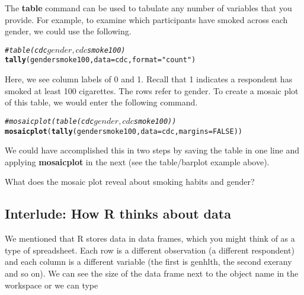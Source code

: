 \documentclass{article}\usepackage[]{graphicx}\usepackage[]{color}
\makeatletter
\newcommand{\hlnum}[1]{\textcolor[rgb]{0.686,0.059,0.569}{#1}}%
\newcommand{\hlstr}[1]{\textcolor[rgb]{0.192,0.494,0.8}{#1}}%
\newcommand{\hlcom}[1]{\textcolor[rgb]{0.678,0.584,0.686}{\textit{#1}}}%
\newcommand{\hlopt}[1]{\textcolor[rgb]{0,0,0}{#1}}%
\newcommand{\hlstd}[1]{\textcolor[rgb]{0.345,0.345,0.345}{#1}}%
\newcommand{\hlkwc}[1]{\textcolor[rgb]{0.333,0.667,0.333}{#1}}%
\newcommand{\hlkwd}[1]{\textcolor[rgb]{0.737,0.353,0.396}{\textbf{#1}}}%
\newenvironment{kframe}{%
 \def\at@end@of@kframe{}%
 \ifinner\ifhmode%
  \def\at@end@of@kframe{\end{minipage}}%
  \begin{minipage}{\columnwidth}%
 \fi\fi%
 \def\FrameCommand##1{\hskip\@totalleftmargin \hskip-\fboxsep
 \colorbox{shadecolor}{##1}\hskip-\fboxsep
     \hskip-\linewidth \hskip-\@totalleftmargin \hskip\columnwidth}%
 \MakeFramed {\advance\hsize-\width
   \@totalleftmargin\z@ \linewidth\hsize
   \@setminipage}}%
 {\par\unskip\endMakeFramed%
 \at@end@of@kframe}
\newenvironment{knitrout}{}{} %
\makeatother
\begin{document}
The \hlkwd{table} command can be used to tabulate any number of variables that you provide.  For example, to examine which participants have smoked across each gender, we could use the following.

\begin{knitrout}
\color{fgcolor}\begin{kframe}
\begin{alltt}
\hlcom{# table(cdc$gender,cdc$smoke100)}
\hlkwd{tally}\hlstd{(gender} \hlopt{\mytilde} \hlstd{smoke100,} \hlkwc{data} \hlstd{= cdc,} \hlkwc{format} \hlstd{=} \hlstr{"count"}\hlstd{)}
\end{alltt}
\end{kframe}
\end{knitrout}

Here, we see column labels of 0 and 1. Recall that 1 indicates a respondent has smoked at least 100 cigarettes. The rows refer to gender. To create a mosaic plot of this table, we would enter the following command.

\begin{knitrout}
\color{fgcolor}\begin{kframe}
\begin{alltt}
\hlcom{# mosaicplot(table(cdc$gender,cdc$smoke100))}
\hlkwd{mosaicplot}\hlstd{(}\hlkwd{tally}\hlstd{(gender} \hlopt{\mytilde} \hlstd{smoke100,} \hlkwc{data} \hlstd{= cdc,} \hlkwc{margins} \hlstd{=} \hlnum{FALSE}\hlstd{))}
\end{alltt}
\end{kframe}
\end{knitrout}

We could have accomplished this in two steps by saving the table in one line and applying \hlkwd{mosaicplot} in the next (see the table/barplot example above).

\begin{exercise}
What does the mosaic plot reveal about smoking habits and gender?
\end{exercise}

\subsection*{Interlude: How R thinks about data}
We mentioned that R stores data in data frames, which you might think of as a type of spreadsheet. Each row is a different observation (a different respondent) and each column is a different variable (the first is \hlstd{genhlth}, the second \hlstd{exerany} and so on). We can see the size of the data frame next to the object name in the workspace or we can type
\end{document}
